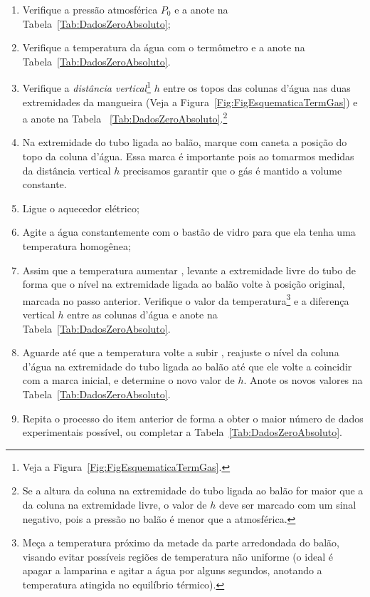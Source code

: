 \begin{enumerate}
\item Verifique a pressão atmosférica $P_0$ e a anote na Tabela~\ref{Tab:DadosZeroAbsoluto};
\item Verifique a temperatura da água com o termômetro e a anote na Tabela~\ref{Tab:DadosZeroAbsoluto}.
\item Verifique a \emph{distância vertical}\footnote{Veja a Figura~\ref{Fig:FigEsquematicaTermGas}.} $h$ entre os topos das colunas d'água nas duas extremidades da mangueira (Veja a Figura~\ref{Fig:FigEsquematicaTermGas}) e a anote na Tabela~
\ref{Tab:DadosZeroAbsoluto}.\footnote{Se a altura da coluna na extremidade do tubo ligada ao balão for maior que a da coluna na extremidade livre, o valor de $h$ deve ser marcado com um sinal negativo, pois a pressão no balão é menor que a atmosférica.}
\item Na extremidade do tubo ligada ao balão, marque com caneta a posição do topo da coluna d'água. Essa marca é importante pois ao tomarmos medidas da distância vertical $h$ precisamos garantir que o gás é mantido a volume constante.
\item Ligue o aquecedor elétrico;
\item Agite a água constantemente com o bastão de vidro para que ela tenha uma temperatura homogênea; 
\item Assim que a temperatura aumentar , levante a extremidade livre do tubo de forma que o nível na extremidade ligada ao balão volte à posição original, marcada no passo anterior. Verifique o valor da temperatura\footnote{Meça a temperatura próximo da metade da parte arredondada do balão, visando evitar possíveis regiões de temperatura não uniforme (o ideal é apagar a lamparina e agitar a água por alguns segundos, anotando a temperatura atingida no equilíbrio térmico).} e a diferença vertical $h$ entre as colunas d'água e anote na Tabela~\ref{Tab:DadosZeroAbsoluto}.
\item Aguarde até que a temperatura volte a subir , reajuste o nível da coluna d'água na extremidade do tubo ligada ao balão até que ele volte a coincidir com a marca inicial, e determine o novo valor de $h$. Anote os novos valores na Tabela~\ref{Tab:DadosZeroAbsoluto}.
\item Repita o processo do item anterior de forma a obter o maior número de dados experimentais possível, ou completar a Tabela~\ref{Tab:DadosZeroAbsoluto}.
\end{enumerate}

